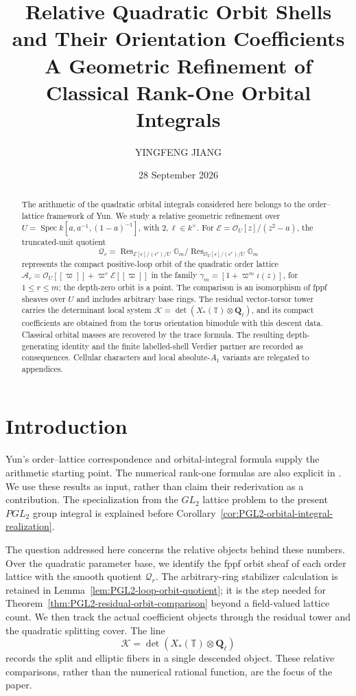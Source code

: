 \documentclass[11pt]{article}
\title{Relative Quadratic Orbit Shells and Their Orientation Coefficients\\
\large A Geometric Refinement of Classical Rank-One Orbital Integrals}
\author{YINGFENG JIANG}
\date{28 September 2026}
\theoremstyle{definition}
\theoremstyle{remark}
\newcommand{\Qell}{\mathbf Q_\ell}
\newcommand{\cK}{\mathcal K}
\newcommand{\Spec}{\operatorname{Spec}}
\begin{document}
\maketitle

\begin{abstract}
The arithmetic of the quadratic orbital integrals considered here belongs
to the order--lattice framework of Yun.  We study a relative geometric
refinement over
$U=\Spec k[a,a^{-1},(1-a)^{-1}]$, with $2,\ell\in k^\times$.
For $\mathcal E=\mathcal O_U[z]/(z^2-a)$, the truncated-unit quotient
\[
 \mathscr Q_r=
 \operatorname{Res}_{\mathcal E[\epsilon]/(\epsilon^r)/U}\mathbb G_m
 /\operatorname{Res}_{\mathcal O_U[\epsilon]/(\epsilon^r)/U}\mathbb G_m
\]
represents the compact positive-loop orbit of the quadratic order lattice
$\mathcal A_r=\mathcal O_U[[\varpi]]+\varpi^r\mathcal E[[\varpi]]$
in the family $\gamma_m=[1+\varpi^m\iota(z)]$, for $1\le r\le m$;
the depth-zero orbit is a point.  The comparison is an isomorphism of
fppf sheaves over $U$ and includes arbitrary base rings.
The residual vector-torsor tower carries the determinant local system
$\cK=\det(X_*(\mathbb T)\otimes\Qell)$, and its compact coefficients
are obtained from the torus orientation bimodule with this descent data.
Classical orbital masses are recovered by the trace formula.
The resulting depth-generating identity and the finite labelled-shell
Verdier partner are recorded as consequences.  Cellular characters and
local absolute-$A_1$ variants are relegated to appendices.
\end{abstract}

\section{Introduction}

Yun's order--lattice correspondence and orbital-integral formula
\cite[\S\S2.1, 4.2, (4.1), Lemma~4.5 and Corollary~4.6]{YunOrbitalOrders}
supply the arithmetic starting point.  The numerical rank-one formulas are
also explicit in \cite[\S5.8, (5.8.4); \S5.9, (5.9.7)]{KottwitzOrbital}.
We use these results as input, rather than claim their rederivation as a
contribution.  The specialization from the $GL_2$ lattice problem to the
present $PGL_2$ group integral is explained before
Corollary~\ref{cor:PGL2-orbital-integral-realization}.

The question addressed here concerns the relative objects behind these
numbers.  Over the quadratic parameter base, we identify the fppf orbit
sheaf of each order lattice with the smooth quotient $\mathscr Q_r$.
The arbitrary-ring stabilizer calculation is retained in
Lemma~\ref{lem:PGL2-loop-orbit-quotient}; it is the step needed for
Theorem~\ref{thm:PGL2-residual-orbit-comparison} beyond a field-valued
lattice count.  We then track the actual coefficient objects through the
residual tower and the quadratic splitting cover.  The line
\[
 \cK=\det(X_*(\mathbb T)\otimes\Qell)
\]
records the split and elliptic fibers in a single descended object.
These relative comparisons, rather than the numerical rational function,
are the focus of the paper.
\end{document}
